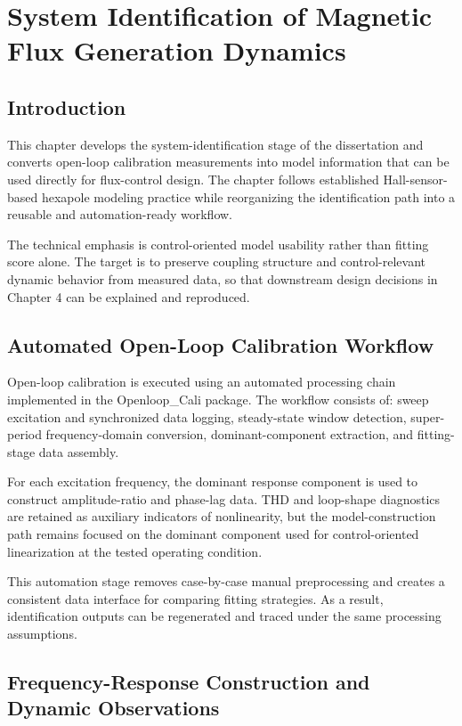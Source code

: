 \chapter{System Identification of Magnetic Flux Generation Dynamics}

\section{Introduction}

This chapter develops the system-identification stage of the dissertation and converts open-loop calibration measurements into model information that can be used directly for flux-control design. The chapter follows established Hall-sensor-based hexapole modeling practice while reorganizing the identification path into a reusable and automation-ready workflow.

The technical emphasis is control-oriented model usability rather than fitting score alone. The target is to preserve coupling structure and control-relevant dynamic behavior from measured data, so that downstream design decisions in Chapter 4 can be explained and reproduced.

\section{Automated Open-Loop Calibration Workflow}

Open-loop calibration is executed using an automated processing chain implemented in the Openloop\_Cali package. The workflow consists of: sweep excitation and synchronized data logging, steady-state window detection, super-period frequency-domain conversion, dominant-component extraction, and fitting-stage data assembly.

For each excitation frequency, the dominant response component is used to construct amplitude-ratio and phase-lag data. THD and loop-shape diagnostics are retained as auxiliary indicators of nonlinearity, but the model-construction path remains focused on the dominant component used for control-oriented linearization at the tested operating condition.

This automation stage removes case-by-case manual preprocessing and creates a consistent data interface for comparing fitting strategies. As a result, identification outputs can be regenerated and traced under the same processing assumptions.

\section{Frequency-Response Construction and Dynamic Observations}


